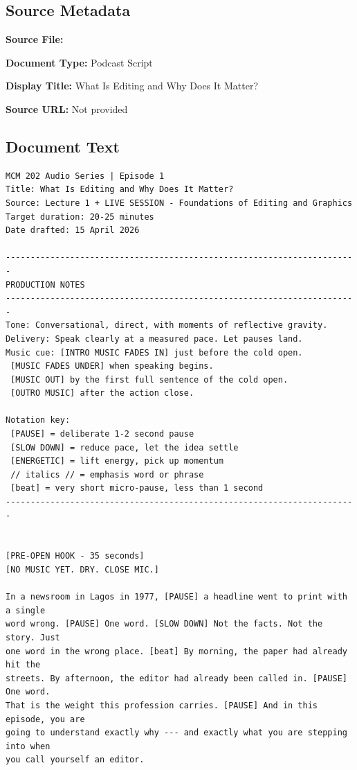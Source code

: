 \subsection*{Source Metadata}
\noindent\textbf{Source File:} \par
\noindent\textbf{Document Type:} Podcast Script\par
\noindent\textbf{Display Title:} What Is Editing and Why Does It Matter?\par
\noindent\textbf{Source URL:} Not provided\par

\subsection*{Document Text}
{\small
\begin{Verbatim}
MCM 202 Audio Series | Episode 1
Title: What Is Editing and Why Does It Matter?
Source: Lecture 1 + LIVE SESSION - Foundations of Editing and Graphics
Target duration: 20-25 minutes
Date drafted: 15 April 2026

-----------------------------------------------------------------------
PRODUCTION NOTES
-----------------------------------------------------------------------
Tone: Conversational, direct, with moments of reflective gravity.
Delivery: Speak clearly at a measured pace. Let pauses land.
Music cue: [INTRO MUSIC FADES IN] just before the cold open.
 [MUSIC FADES UNDER] when speaking begins.
 [MUSIC OUT] by the first full sentence of the cold open.
 [OUTRO MUSIC] after the action close.

Notation key:
 [PAUSE] = deliberate 1-2 second pause
 [SLOW DOWN] = reduce pace, let the idea settle
 [ENERGETIC] = lift energy, pick up momentum
 // italics // = emphasis word or phrase
 [beat] = very short micro-pause, less than 1 second
-----------------------------------------------------------------------


[PRE-OPEN HOOK - 35 seconds]
[NO MUSIC YET. DRY. CLOSE MIC.]

In a newsroom in Lagos in 1977, [PAUSE] a headline went to print with a single
word wrong. [PAUSE] One word. [SLOW DOWN] Not the facts. Not the story. Just
one word in the wrong place. [beat] By morning, the paper had already hit the
streets. By afternoon, the editor had already been called in. [PAUSE] One word.
That is the weight this profession carries. [PAUSE] And in this episode, you are
going to understand exactly why --- and exactly what you are stepping into when
you call yourself an editor.


\end{Verbatim}}
